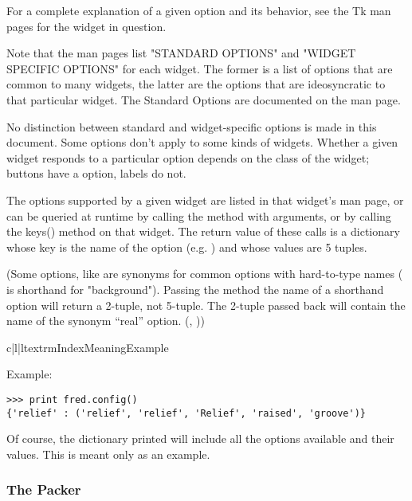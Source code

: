 For a complete explanation of a given option and its behavior, see the
Tk man pages for the widget in question.

Note that the man pages list "STANDARD OPTIONS" and "WIDGET SPECIFIC
OPTIONS" for each widget.  The former is a list of options that are
common to many widgets, the latter are the options that are
ideosyncratic to that particular widget.  The Standard Options are
documented on the  man page.

No distinction between standard and widget-specific options is made in
this document.  Some options don't apply to some kinds of widgets.
Whether a given widget responds to a particular option depends on the
class of the widget; buttons have a  option, labels do not. 

The options supported by a given widget are listed in that widget's
man page, or can be queried at runtime by calling the
 method with arguments, or by calling the keys()
method on that widget. The return value of these calls is a dictionary
whose key is the name of the option (e.g. ) and whose
values are 5 tuples. 

(Some options, like  are synonyms for common options with
hard-to-type names ( is shorthand for "background"). 
Passing the  method the name of a
shorthand option will return a 2-tuple, not 5-tuple. The 2-tuple
passed back will contain the name of the synonym ``real''
option. (, ))

\begin{tableiii}{c|l|l}{textrm}{Index}{Meaning}{Example}
                         {}
     {}
    {}
                       {}
                       {}
\end{tableiii}


Example:

\begin{verbatim}
>>> print fred.config()
{'relief' : ('relief', 'relief', 'Relief', 'raised', 'groove')}
\end{verbatim}

Of course, the dictionary printed will include all the options
available and their values.  This is meant only as an example.


\subsubsection{The Packer} %

